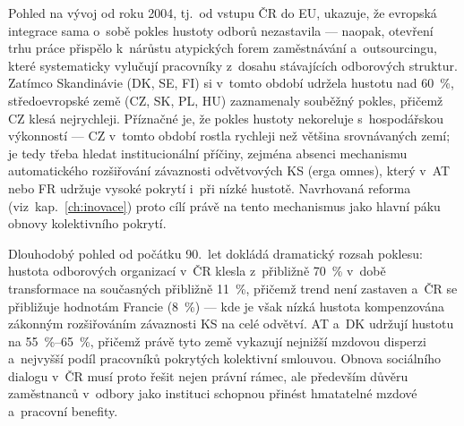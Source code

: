 Pohled na vývoj od roku 2004, tj.\ od vstupu ČR do \ac{EU}, ukazuje, že evropská integrace sama o~sobě pokles hustoty odborů nezastavila --- naopak, otevření trhu práce přispělo k~nárůstu atypických forem zaměstnávání a~outsourcingu, které systematicky vylučují pracovníky z~dosahu stávajících odborových struktur.
Zatímco Skandinávie (DK, SE, FI) si v~tomto období udržela hustotu nad \SI{60}{\percent}, středoevropské země (CZ, SK, PL, HU) zaznamenaly souběžný pokles, přičemž CZ klesá nejrychleji.
Příznačné je, že pokles hustoty nekoreluje s~hospodářskou výkonností --- CZ v~tomto období rostla rychleji než většina srovnávaných zemí; je tedy třeba hledat institucionální příčiny, zejména absenci mechanismu automatického rozšiřování závaznosti odvětvových \ac{KS} (erga omnes), který v~AT nebo FR udržuje vysoké pokrytí i~při nízké hustotě.
Navrhovaná reforma (viz~kap.~\ref{ch:inovace}) proto cílí právě na tento mechanismus jako hlavní páku obnovy kolektivního pokrytí.



Dlouhodobý pohled od počátku 90.~let dokládá dramatický rozsah poklesu: hustota odborových organizací v~ČR klesla z~přibližně \SI{70}{\percent} v~době transformace na současných přibližně \SI{11}{\percent}, přičemž trend není zastaven a~ČR se přibližuje hodnotám Francie (\SI{8}{\percent}) --- kde je však nízká hustota kompenzována zákonným rozšiřováním závaznosti \ac{KS} na celé odvětví.
AT a~DK udržují hustotu na \SIrange{55}{65}{\percent}, přičemž právě tyto země vykazují nejnižší mzdovou disperzi a~nejvyšší podíl pracovníků pokrytých kolektivní smlouvou.
Obnova sociálního dialogu v~ČR musí proto řešit nejen právní rámec, ale především důvěru zaměstnanců v~odbory jako instituci schopnou přinést hmatatelné mzdové a~pracovní benefity.
